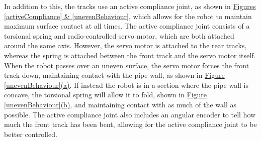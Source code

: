 \documentclass[11pt]{article}		%
\begin{document}
				In addition to this, the tracks use an active compliance joint, as shown in \hyperref[activeCompliance]{Figures \ref*{activeCompliance} \& \ref*{unevenBehaviour}}, which allows for the robot to maintain maximum surface contact at all times.
				The active compliance joint consists of a torsional spring and radio-controlled servo motor, which are both attached around the same axis.
				However, the servo motor is attached to the rear tracks, whereas the spring is attached between the front track and the servo motor itself.
				When the robot passes over an uneven surface, the servo motor forces the front track down, maintaining contact with the pipe wall, as shown in \hyperref[unevenBehaviour]{Figure \ref*{unevenBehaviour}(a)}.
				If instead the robot is in a section where the pipe wall is concave, the torsional spring will allow it to fold, shown in \hyperref[unevenBehaviour]{Figure \ref*{unevenBehaviour}(b)}, and maintaining contact with as much of the wall as possible.
				The active compliance joint also includes an angular encoder to tell how much the front track has been bent, allowing for the active compliance joint to be better controlled.			
\end{document}
